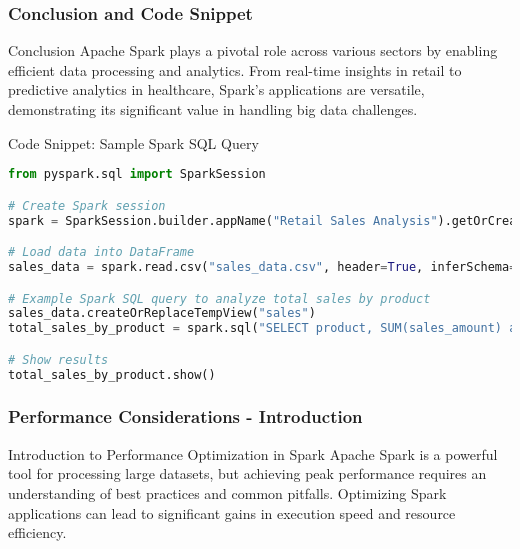\documentclass[aspectratio=169]{beamer}
\begin{document}
\begin{frame}[fragile]
    \frametitle{Conclusion and Code Snippet}
    \begin{block}{Conclusion}
        Apache Spark plays a pivotal role across various sectors by enabling efficient data processing and analytics. 
        From real-time insights in retail to predictive analytics in healthcare, Spark’s applications are versatile, demonstrating its significant value in handling big data challenges.
    \end{block}
    
    \begin{block}{Code Snippet: Sample Spark SQL Query}
        \begin{lstlisting}[language=Python]
from pyspark.sql import SparkSession

# Create Spark session
spark = SparkSession.builder.appName("Retail Sales Analysis").getOrCreate()

# Load data into DataFrame
sales_data = spark.read.csv("sales_data.csv", header=True, inferSchema=True)

# Example Spark SQL query to analyze total sales by product
sales_data.createOrReplaceTempView("sales")
total_sales_by_product = spark.sql("SELECT product, SUM(sales_amount) as total_sales FROM sales GROUP BY product")

# Show results
total_sales_by_product.show()
        \end{lstlisting}
    \end{block}
\end{frame}

\begin{frame}[fragile]
    \frametitle{Performance Considerations - Introduction}
    \begin{block}{Introduction to Performance Optimization in Spark}
        Apache Spark is a powerful tool for processing large datasets, but achieving peak performance requires an understanding of best practices and common pitfalls. Optimizing Spark applications can lead to significant gains in execution speed and resource efficiency.
    \end{block}
\end{frame}
\end{document}
